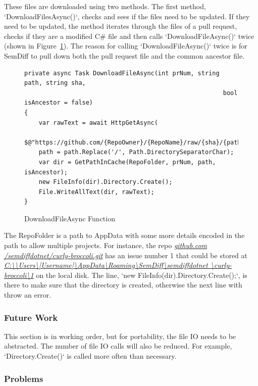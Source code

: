 \documentclass[draftclsnofoot,onecolumn]{IEEEtran}
\begin{document}
These files are downloaded using two methods. The first method, 
`DownloadFilesAsync()`, checks and sees if the files need to be 
updated. If they need to be updated, the method iterates through the files of 
a pull request, checks if they are a modified C\# file and then calls 
`DownloadFileAsync()` twice (shown in Figure~\ref{DownloadFileAsync}). The 
reason for calling `DownloadFileAsync()` twice is for SemDiff to pull down 
both the pull request file and the common ancestor file. 

\begin{figure}[!htb]
\centering
\begin{lstlisting}
private async Task DownloadFileAsync(int prNum, string path, string sha, 
                                                       bool isAncestor = false)
{
    var rawText = await HttpGetAsync(
	           $@"https://github.com/{RepoOwner}/{RepoName}/raw/{sha}/{path}");
    path = path.Replace('/', Path.DirectorySeparatorChar);
    var dir = GetPathInCache(RepoFolder, prNum, path, isAncestor);
    new FileInfo(dir).Directory.Create();
    File.WriteAllText(dir, rawText);
}
\end{lstlisting}
\caption{DownloadFileAsync Function}
\label{DownloadFileAsync}
\end{figure}

The RepoFolder is a path to AppData with some more details encoded in the path 
to allow multiple projects. For instance, the repo \textit{\url{github.com
/semdiffdotnet/curly-broccoli.git}} has an issue number 1 that could be stored 
at \textit{\url{C:\\Users\[Username]\AppData\Roaming\SemDiff\semdiffdotnet
\curly-broccoli\1}} on the local disk. The line, 
`new FileInfo(dir).Directory.Create();`, is there to make sure that the 
directory is created, otherwise the next line with throw an error.

\subsubsection{Future Work}

This section is in working order, but for portability, the file IO needs to be 
abstracted. The number of file IO calls will also be reduced. For example, 
`Directory.Create()` is called more often than necessary.

\subsubsection{Problems}
\end{document}
